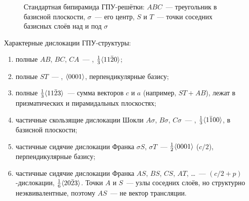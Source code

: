 \begin{figure}[ht]
\centering
{}
\caption{Стандартная бипирамида ГПУ-решётки: $ABC$~— треугольник в
базисной плоскости, $\sigma$~— его центр, $S$ и $T$~— точки соседних
базисных слоёв над и под $\sigma$}
\label{fig:bipyramid}
\end{figure}

Характерные дислокации ГПУ-структуры:
\begin{enumerate}[label=\arabic*)]
\item полные $AB$, $BC$, $CA$~— , $\frac13\langle 11\bar{2}0\rangle$;
\item полные $ST$~— , $\langle 0001\rangle$, перпендикулярные
базису;
\item полные  $\frac13\langle 11\bar{2}3\rangle$~— сумма
векторов $c$ и $a$ (например, $ST+AB$), лежат в призматических и
пирамидальных плоскостях;
\item частичные скользящие дислокации Шокли $A\sigma$, $B\sigma$,
$C\sigma$~— , $\frac13\langle 1\bar{1}00\rangle$, в базисной
плоскости;
\item частичные сидячие дислокации Франка $\sigma S$, $\sigma T$~—
$\frac12\langle 0001\rangle$ ($c/2$), перпендикулярные базису;
\item частичные сидячие дислокации Франка $AS$, $BS$, $CS$, $AT$, \ldots~—
$(c/2+p)$-дислокации, $\frac16\langle 20\bar{2}3\rangle$. Точки $A$ и $S$~— узлы
соседних слоёв, но структурно неэквивалентные, поэтому $AS$~— не вектор
трансляции.
\end{enumerate}

